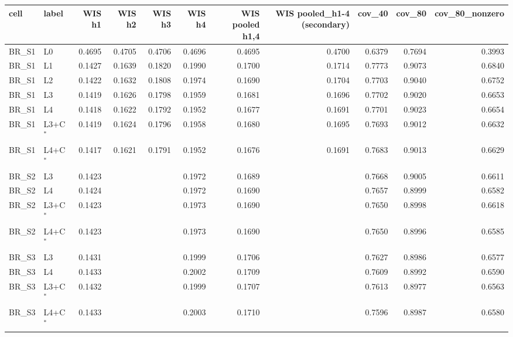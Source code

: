 \begin{tabular}{llrrrrrrrrr}
\toprule
cell & label & WIS h1 & WIS h2 & WIS h3 & WIS h4 & WIS pooled h{1,4} & WIS pooled\_h1-4 (secondary) & cov\_40 & cov\_80 & cov\_80\_nonzero \\
\midrule
BR\_S1 & L0 & 0.4695 & 0.4705 & 0.4706 & 0.4696 & 0.4695 & 0.4700 & 0.6379 & 0.7694 & 0.3993 \\
BR\_S1 & L1 & 0.1427 & 0.1639 & 0.1820 & 0.1990 & 0.1700 & 0.1714 & 0.7773 & 0.9073 & 0.6840 \\
BR\_S1 & L2 & 0.1422 & 0.1632 & 0.1808 & 0.1974 & 0.1690 & 0.1704 & 0.7703 & 0.9040 & 0.6752 \\
BR\_S1 & L3 & 0.1419 & 0.1626 & 0.1798 & 0.1959 & 0.1681 & 0.1696 & 0.7702 & 0.9020 & 0.6653 \\
BR\_S1 & L4 & 0.1418 & 0.1622 & 0.1792 & 0.1952 & 0.1677 & 0.1691 & 0.7701 & 0.9023 & 0.6654 \\
BR\_S1 & L3+C$^{*}$ & 0.1419 & 0.1624 & 0.1796 & 0.1958 & 0.1680 & 0.1695 & 0.7693 & 0.9012 & 0.6632 \\
BR\_S1 & L4+C$^{*}$ & 0.1417 & 0.1621 & 0.1791 & 0.1952 & 0.1676 & 0.1691 & 0.7683 & 0.9013 & 0.6629 \\
BR\_S2 & L3 & 0.1423 &  &  & 0.1972 & 0.1689 &  & 0.7668 & 0.9005 & 0.6611 \\
BR\_S2 & L4 & 0.1424 &  &  & 0.1972 & 0.1690 &  & 0.7657 & 0.8999 & 0.6582 \\
BR\_S2 & L3+C$^{*}$ & 0.1423 &  &  & 0.1973 & 0.1690 &  & 0.7650 & 0.8998 & 0.6618 \\
BR\_S2 & L4+C$^{*}$ & 0.1423 &  &  & 0.1973 & 0.1690 &  & 0.7650 & 0.8996 & 0.6585 \\
BR\_S3 & L3 & 0.1431 &  &  & 0.1999 & 0.1706 &  & 0.7627 & 0.8986 & 0.6577 \\
BR\_S3 & L4 & 0.1433 &  &  & 0.2002 & 0.1709 &  & 0.7609 & 0.8992 & 0.6590 \\
BR\_S3 & L3+C$^{*}$ & 0.1432 &  &  & 0.1999 & 0.1707 &  & 0.7613 & 0.8977 & 0.6563 \\
BR\_S3 & L4+C$^{*}$ & 0.1433 &  &  & 0.2003 & 0.1710 &  & 0.7596 & 0.8987 & 0.6580 \\

\end{tabular}
